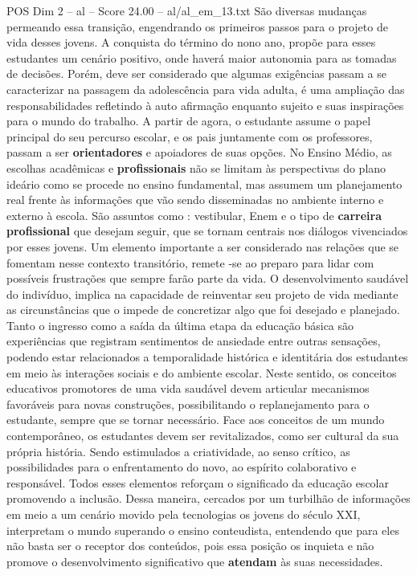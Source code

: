 \begin{textsample}{POS Dim 2 – al – Score 24.00 – al/al\_em\_13.txt}
São diversas mudanças permeando essa transição, engendrando os primeiros passos para o projeto de vida desses jovens.
A conquista do término do nono ano, propõe para esses estudantes um cenário positivo, onde haverá maior autonomia para as tomadas de decisões.
Porém, deve ser considerado que algumas exigências passam a se caracterizar na passagem da adolescência para vida adulta, é uma ampliação das responsabilidades refletindo à auto afirmação enquanto sujeito e suas inspirações para o mundo do trabalho.
A partir de agora, o estudante assume o papel principal do seu percurso escolar, e os pais juntamente com os professores, passam a ser \textbf{orientadores} e apoiadores de suas opções.
No Ensino Médio, as escolhas acadêmicas e \textbf{profissionais} não se limitam às perspectivas do plano ideário como se procede no ensino fundamental, mas assumem um planejamento real frente às informações que vão sendo disseminadas no ambiente interno e externo à escola.
São assuntos como : vestibular, Enem e o tipo de \textbf{carreira} \textbf{profissional} que desejam seguir, que se tornam centrais nos diálogos vivenciados por esses jovens.
Um elemento importante a ser considerado nas relações que se fomentam nesse contexto transitório, remete -se ao preparo para lidar com possíveis frustrações que sempre farão parte da vida.
O desenvolvimento saudável do indivíduo, implica na capacidade de reinventar seu projeto de vida mediante as circunstâncias que o impede de concretizar algo que foi desejado e planejado.
Tanto o ingresso como a saída da última etapa da educação básica são experiências que registram sentimentos de ansiedade entre outras sensações, podendo estar relacionados a temporalidade histórica e identitária dos estudantes em meio às interações sociais e do ambiente escolar.
Neste sentido, os conceitos educativos promotores de uma vida saudável devem articular mecanismos favoráveis para novas construções, possibilitando o replanejamento para o estudante, sempre que se tornar necessário.
Face aos conceitos de um mundo contemporâneo, os estudantes devem ser revitalizados, como ser cultural da sua própria história.
Sendo estimulados a criatividade, ao senso crítico, as possibilidades para o enfrentamento do novo, ao espírito colaborativo e responsável.
Todos esses elementos reforçam o significado da educação escolar promovendo a inclusão.
Dessa maneira, cercados por um turbilhão de informações em meio a um cenário movido pela tecnologias os jovens do século XXI, interpretam o mundo superando o ensino conteudista, entendendo que para eles não basta ser o receptor dos conteúdos, pois essa posição os inquieta e não promove o desenvolvimento significativo que \textbf{atendam} às suas necessidades.

\end{textsample}
